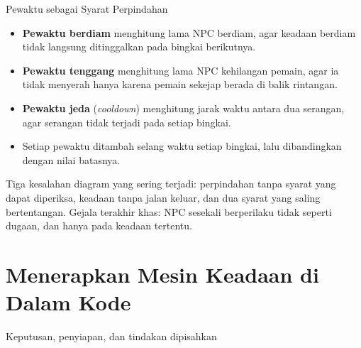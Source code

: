 \documentclass[aspectratio=169,10pt]{beamer}
\begin{document}
\begin{frame}{Pewaktu sebagai Syarat Perpindahan}
\begin{itemize}
  \item \textbf{Pewaktu berdiam} menghitung lama NPC berdiam, agar keadaan
        berdiam tidak langsung ditinggalkan pada bingkai berikutnya.
  \item \textbf{Pewaktu tenggang} menghitung lama NPC kehilangan pemain, agar
        ia tidak menyerah hanya karena pemain sekejap berada di balik
        rintangan.
  \item \textbf{Pewaktu jeda} (\emph{cooldown}) menghitung jarak waktu antara
        dua serangan, agar serangan tidak terjadi pada setiap bingkai.
  \item Setiap pewaktu ditambah selang waktu setiap bingkai, lalu dibandingkan
        dengan nilai batasnya.
\end{itemize}
\vspace{0.12cm}
\begin{peringatan}
Tiga kesalahan diagram yang sering terjadi: perpindahan tanpa syarat yang dapat
diperiksa, keadaan tanpa jalan keluar, dan dua syarat yang saling bertentangan.
Gejala terakhir khas: NPC sesekali berperilaku tidak seperti dugaan, dan hanya
pada keadaan tertentu.
\end{peringatan}
\end{frame}

\section{Menerapkan Mesin Keadaan di Dalam Kode}
  {Keputusan, penyiapan, dan tindakan dipisahkan}
\end{document}
